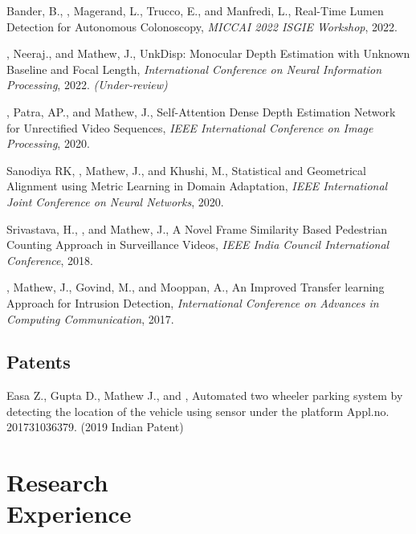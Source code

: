 \documentclass[mm]{simple_style}
\begin{document}
\begin{resume}
Bander, B., , Magerand, L., Trucco, E., and Manfredi, L., Real-Time Lumen Detection for Autonomous Colonoscopy, \textit{MICCAI 2022 ISGIE Workshop}, 2022.

, Neeraj., and Mathew, J., UnkDisp: Monocular Depth Estimation with
Unknown Baseline and Focal Length, \textit{International Conference on Neural Information Processing}, 2022. \textit{(Under-review)}

, Patra, AP., and Mathew, J., Self-Attention Dense Depth Estimation Network for Unrectified Video Sequences, \textit{IEEE International Conference on Image Processing}, 2020.

Sanodiya RK, , Mathew, J., and Khushi, M., Statistical and Geometrical Alignment using Metric Learning in Domain Adaptation, \textit{IEEE International Joint Conference on Neural Networks}, 2020.

Srivastava, H., , and Mathew, J., A Novel Frame Similarity Based Pedestrian Counting Approach in Surveillance Videos, \textit{IEEE India Council International Conference}, 2018.

, Mathew, J., Govind, M., and Mooppan, A., An Improved Transfer learning Approach for Intrusion Detection, \textit{International Conference on Advances in Computing  Communication}, 2017.\\
\halfsectionline
\vspace{-12mm}
\subsection{Patents}
\vspace{-2ex}

Easa Z., Gupta D., Mathew J., and , Automated two wheeler parking system by detecting the location of the vehicle using sensor under the platform Appl.no. 201731036379. (2019 Indian Patent)

\vspace{-2ex}
\sectionline


\section{Research\\Experience}


\end{resume}
\end{document}
